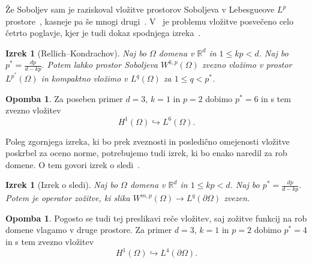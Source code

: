 \documentclass[12pt,a4paper,twoside]{article}
\theoremstyle{definition} %
\newtheorem{opomba}[definicija]{Opomba}
\theoremstyle{plain} %
\newtheorem{izrek}[definicija]{Izrek}
\numberwithin{equation}{section}
\newcommand{\R}{\mathbb R}
\begin{document}
Že Soboljev sam je raziskoval vložitve prostorov Soboljeva v Lebesgueove $L^p$
prostore~\cite{soboleff1938theoreme}, kasneje pa še mnogi
drugi~\cite{brezis1980note,edmunds2000sobolev,evans1987sobolev}. V~\cite{adams2003sobolev} je
problemu vložitve posvečeno celo četrto poglavje, kjer je tudi dokaz spodnjega izreka~\cite[str.~85,
izrek 4.12]{adams2003sobolev}.
\begin{izrek}[Rellich--Kondrachov]
  \label{izr:vlozitev-sobolj}
  Naj bo $\Omega$ domena v $\R^d$ in $1 \leq kp < d$. Naj bo $p^\ast = \frac{dp}{d-kp}.$ Potem lahko
  prostor Soboljeva $W^{k,p}(\Omega)$ zvezno vložimo v prostor $L^{p^\ast}(\Omega)$ in kompaktno
  vložimo v $L^q(\Omega)$ za $1 \leq q < p^\ast$.
\end{izrek}
\begin{opomba}
  Za poseben primer $d=3$, $k=1$ in $p=2$ dobimo $p^\ast = 6$ in s tem zvezno vložitev
  \begin{equation}
    \label{eq:vloz-int}
    H^1(\Omega) \hookrightarrow L^6(\Omega).
  \end{equation}
\end{opomba}
Poleg zgornjega izreka, ki bo prek zveznosti in posledično omejenosti vložitve poskrbel za oceno
norme, potrebujemo tudi izrek, ki bo enako naredil za rob domene. O tem govori izrek o
sledi~\cite[str.\ 164, izrek 5.36]{adams2003sobolev}.
\begin{izrek}[Izrek o sledi]
  \label{izr:soboljev-sled}
  Naj bo $\Omega$ domena v $\R^d$ in $1 \leq kp < d$. Naj bo $p^\ast = \frac{dp}{d-kp}.$  Potem
  je operator zožitve, ki slika $W^{m,p}(\Omega) \to L^q(\partial \Omega)$ zvezen.
\end{izrek}
\begin{opomba}
  Pogosto se tudi tej preslikavi reče vložitev, saj zožitve funkcij na rob domene vlagamo v druge
  prostore. Za primer $d=3$, $k=1$ in $p=2$ dobimo $p^\ast = 4$ in s tem zvezno vložitev
  \begin{equation}
    \label{eq:vloz-rob}
    H^1(\Omega) \hookrightarrow L^4(\partial\Omega).
  \end{equation}
\end{opomba}
\end{document}
